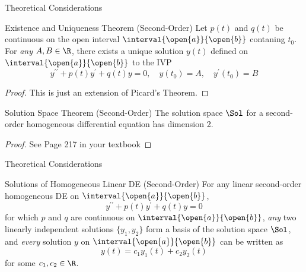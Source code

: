 \documentclass{beamer}
\begin{document}
\begin{frame}{Theoretical Considerations}
\begin{block}{Existence and Uniqueness Theorem (Second-Order)}
Let $p(t)$ and $q(t)$ be continuous on the open interval $\interval{\open{a}}{\open{b}}$ contaning $t_0$. For \emph{any} $A,B\in\R$, there exists a unique solution $y(t)$ defined on $\interval{\open{a}}{\open{b}}$ to the IVP
\begin{equation*}
y^{\prime\prime}+p(t)y^{\prime}+q(t)y=0,
\quad y(t_0)=A,
\quad y^{\prime}(t_0)=B
\end{equation*}
\end{block}\pause
\begin{proof}
This is just an extension of Picard's Theorem.
\end{proof}\pause
\begin{block}{Solution Space Theorem (Second-Order)}
The solution space $\Sol$ for a second-order homogeneous differential equation has dimension 2.
\end{block}\pause
\begin{proof}
See Page 217 in your textbook
\end{proof}
\end{frame}

\begin{frame}{Theoretical Considerations}
\begin{block}{Solutions of Homogeneous Linear DE (Second-Order)}
For any linear second-order homogeneous DE on $\interval{\open{a}}{\open{b}}$,
\begin{equation*}
y^{\prime\prime}+p(t)y^{\prime}+q(t)y=0
\end{equation*}
for which $p$ and $q$ are continuous on $\interval{\open{a}}{\open{b}}$, \emph{any} two linearly independent solutions $\{y_1,y_2\}$ form a basis of the solution space $\Sol$, and \emph{every} solution $y$ on $\interval{\open{a}}{\open{b}}$ can be written as
\begin{equation*}
y(t)=c_1y_1(t)+c_2y_2(t)
\end{equation*}
for some $c_1,c_2\in\R$.
\end{block}
\end{frame}
\end{document}
